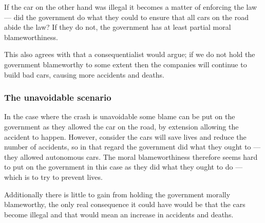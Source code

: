 If the car on the other hand was illegal it becomes a matter of enforcing the
law --- did the government do what they could to ensure that all cars on the
road abide the law? If they do not, the government has at least partial moral
blameworthiness.

This also agrees with that a consequentialist would argue; if we do not hold the
government blameworthy to some extent then the companies will continue to build
bad cars, causing more accidents and deaths.

\subsubsection{The unavoidable scenario}
In the case where the crash is unavoidable some blame can be put on the
government as they allowed the car on the road, by extension allowing the
accident to happen. However, consider the cars will save lives and reduce the
number of accidents, so in that regard the government did what they ought to ---
they allowed autonomous cars. The moral blameworthiness therefore seems hard to
put on the government in this case as they did what they ought to do --- which
is to try to prevent lives.

Additionally there is little to gain from holding the government morally
blameworthy, the only real consequence it could have would be that the cars
become illegal and that would mean an increase in accidents and deaths.
